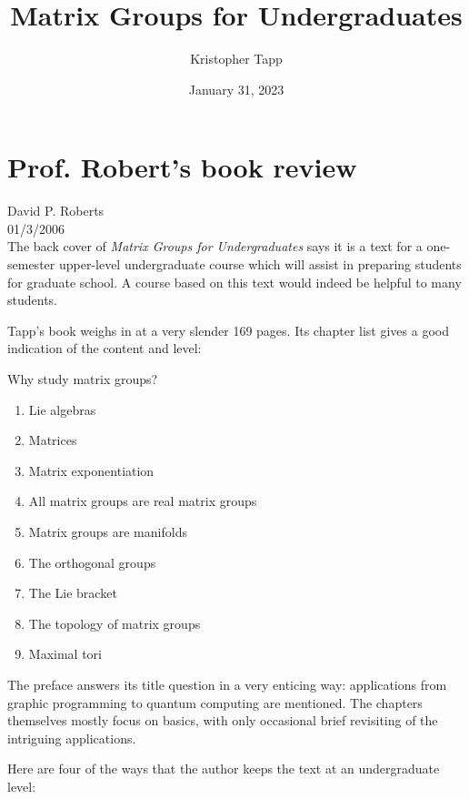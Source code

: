 \documentclass{article}
\title{Matrix Groups for Undergraduates}
\author{Kristopher Tapp}
\date{January 31, 2023}
\begin{document}
\maketitle
\newpage

\section*{Prof. Robert's book review}
David P. Roberts\\
01/3/2006\\

The back cover of \textit{Matrix Groups for Undergraduates} says it is a text for a one-semester upper-level undergraduate course which will assist in preparing students for graduate school. A course based on this text would indeed be helpful to many students.

Tapp's book weighs in at a very slender 169 pages. Its chapter list gives a good indication of the content and level:
 
Why study matrix groups?
\begin{enumerate}[noitemsep]
  \item Lie algebras
  \item Matrices
  \item Matrix exponentiation
  \item All matrix groups are real matrix groups
  \item Matrix groups are manifolds
  \item The orthogonal groups
  \item The Lie bracket
  \item The topology of matrix groups
  \item Maximal tori
\end{enumerate}

The preface answers its title question in a very enticing way: applications from graphic programming to quantum computing are mentioned. The chapters themselves mostly focus on basics, with only occasional brief revisiting of the intriguing applications.

Here are four of the ways that the author keeps the text at an undergraduate level:
\end{document}
